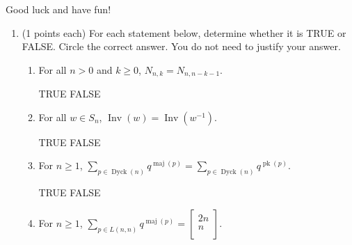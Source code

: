 \documentclass[11pt]{article}
\theoremstyle{definition}
\newcommand{\ds}{\displaystyle}
\DeclareMathOperator{\Inv}{Inv}
\DeclareMathOperator{\pk}{pk}
\DeclareMathOperator{\Dyck}{Dyck}
\DeclareMathOperator{\maj}{maj}
\newcommand{\euler}[2]{
  \displaystyle \left\langle\begin{matrix}#1  \\#2  \\ \end{matrix}\right\rangle}
\newcommand{\qbinom}[2]{
  \displaystyle \left[\begin{matrix}#1  \\#2  \\ \end{matrix}\right]}
\newcommand{\stirling}[2]{
  \displaystyle \left\{\begin{matrix}#1  \\#2  \\ \end{matrix}\right\}}
\begin{document}
Good luck and have fun!

\newpage

\begin{enumerate}

\item (1 points each) For each statement below, determine whether it is TRUE or FALSE.  Circle the correct answer. You do not need to justify your answer.

\begin{enumerate}[label=\text{(\alph*)}]

\item For all $n>0$ and $k\geq 0$, $N_{n,k}=N_{n,n-k-1}$.

\smallskip

TRUE \qquad FALSE

%
%

%
%

%
%

%
%

%
%

%
%

\item For all $w\in S_n$, $\Inv(w)=\Inv(w^{-1})$.

\smallskip

TRUE \qquad FALSE

\item For $n\geq 1$, $\displaystyle \sum_{p\in\Dyck(n)} q^{\maj(p)} =\sum_{p\in\Dyck(n)}q^{\pk(p)}$. 

\smallskip

TRUE \qquad FALSE

\item For $n\geq 1$, $\displaystyle \sum_{p\in L(n,n)} q^{\maj(p)} =\qbinom{2n}{n}$. 


\end{enumerate}
\end{enumerate}
\end{document}

